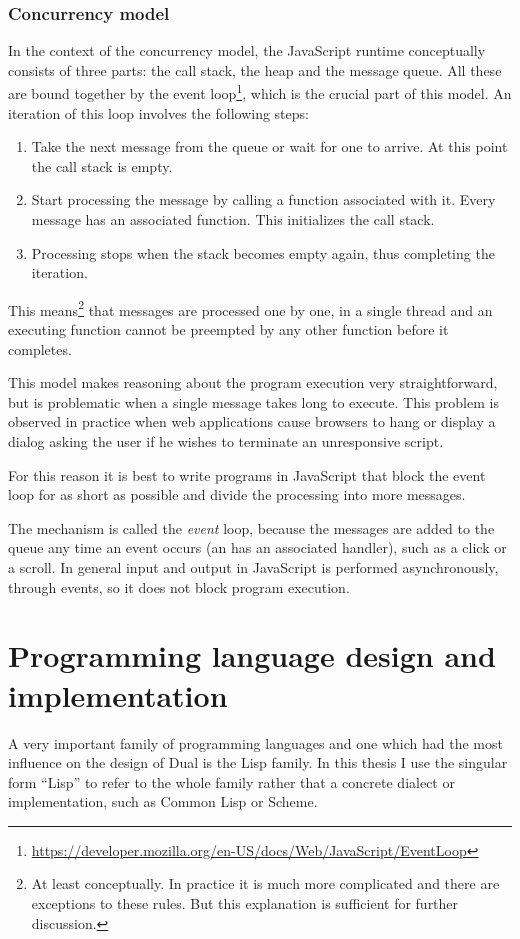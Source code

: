 \subsubsection{Concurrency model}
In the context of the concurrency model, the JavaScript runtime conceptually
consists of three parts: the call stack, the heap and the message queue. All
these are bound together by the event
loop\footnote{\url{https://developer.mozilla.org/en-US/docs/Web/JavaScript/EventLoop}},
which is the crucial part of this model.  An iteration of this loop involves the
following steps:
\begin{enumerate}
	\item Take the next message from the queue or wait for one to arrive. At
          this point the call stack is empty.
	\item Start processing the message by calling a function associated with
          it. Every message has an associated function. This initializes the
          call stack.
	\item Processing stops when the stack becomes empty again, thus
          completing the iteration.
\end{enumerate}

This means\footnote{At least conceptually. In practice it is much more
  complicated and there are exceptions to these rules. But this explanation is
  sufficient for further discussion.} that messages are processed one by one, in
a single thread and an executing function cannot be preempted by any other
function before it completes.

This model makes reasoning about the program execution very straightforward, but
is problematic when a single message takes long to execute. This problem is
observed in practice when web applications cause browsers to hang or display a
dialog asking the user if he wishes to terminate an unresponsive script.

For this reason it is best to write programs in JavaScript that block the event
loop for as short as possible and divide the processing into more messages.

The mechanism is called the \textit{event} loop, because the messages are added
to the queue any time an event occurs (an has an associated handler), such as a
click or a scroll. In general input and output in JavaScript is performed
asynchronously, through events, so it does not block program execution.


\section{Programming language design and implementation}
A very important family of programming languages and one which had the most
influence on the design of Dual is the Lisp family. In this thesis I use the
singular form ``Lisp'' to refer to the whole family rather that a concrete
dialect or implementation, such as Common Lisp or Scheme.


